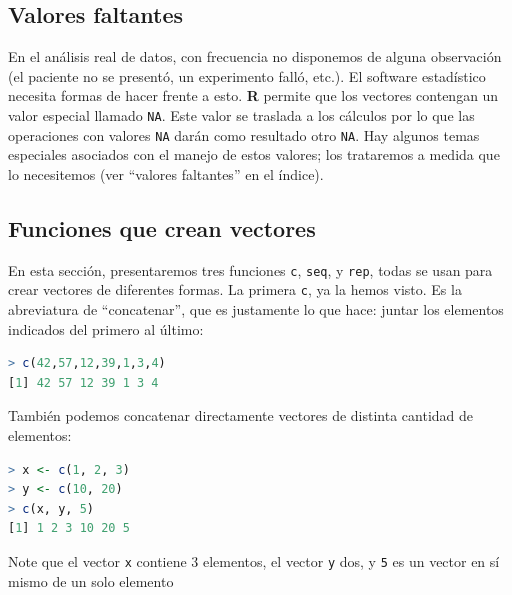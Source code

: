 \subsection{Valores faltantes} \label{na}

En el análisis real de datos, con frecuencia no disponemos de alguna
observación (el paciente no se presentó, un experimento falló, etc.). El
software estadístico necesita formas de hacer frente a esto. \textbf{R} permite
que los vectores contengan un valor especial llamado \texttt{NA}. Este valor se
traslada a los cálculos por lo que las operaciones con valores \texttt{NA}
darán como resultado otro \texttt{NA}. Hay algunos temas especiales asociados
con el manejo de estos valores; los trataremos a medida que lo necesitemos (ver
``valores faltantes'' en el índice).

\subsection{Funciones que crean vectores}

En esta sección, presentaremos tres funciones \texttt{c}, \texttt{seq}, y
\texttt{rep}, todas se usan para crear vectores de diferentes formas.  La
primera \texttt{c}, ya la hemos visto. Es la abreviatura de ``concatenar'', que
es justamente lo que hace: juntar los elementos indicados del primero al último:

\begin{lstlisting}[language=R]
> c(42,57,12,39,1,3,4)
[1] 42 57 12 39 1 3 4
\end{lstlisting}

También podemos concatenar directamente vectores de distinta cantidad de elementos:

\begin{lstlisting}[language=R]
> x <- c(1, 2, 3)
> y <- c(10, 20)
> c(x, y, 5)
[1] 1 2 3 10 20 5
\end{lstlisting}

\begin{tradnote} Note que el vector \texttt{x} contiene 3 elementos, el vector
\texttt{y} dos, y \texttt{5} es un vector en sí mismo de un solo elemento
\end{tradnote}


